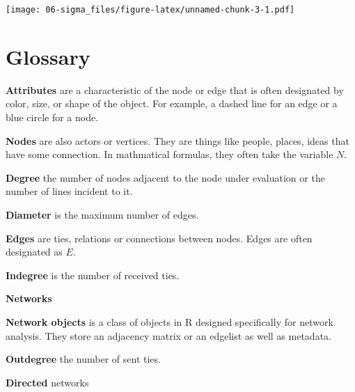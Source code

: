 \documentclass[]{book}
\newenvironment{Shaded}{\begin{snugshade}}{\end{snugshade}}
\newcommand{\DataTypeTok}[1]{\textcolor[rgb]{0.13,0.29,0.53}{#1}}
\newcommand{\DecValTok}[1]{\textcolor[rgb]{0.00,0.00,0.81}{#1}}
\newcommand{\KeywordTok}[1]{\textcolor[rgb]{0.13,0.29,0.53}{\textbf{#1}}}
\newcommand{\NormalTok}[1]{#1}
\newcommand{\OperatorTok}[1]{\textcolor[rgb]{0.81,0.36,0.00}{\textbf{#1}}}
\newcommand{\StringTok}[1]{\textcolor[rgb]{0.31,0.60,0.02}{#1}}
\begin{document}
\begin{Shaded}
\end{Shaded}

\texttt{[image: 06-sigma\_files/figure-latex/unnamed-chunk-3-1.pdf]}

\hypertarget{glossary}{%
\chapter{Glossary}\label{glossary}}

\textbf{Attributes} are a characteristic of the node or edge that is often designated by color, size, or shape of the object. For example, a dashed line for an edge or a blue circle for a node.

\textbf{Nodes} are also actors or vertices. They are things like people, places, ideas that have some connection. In mathmatical formulas, they often take the variable \(N\).

\textbf{Degree} the number of nodes adjacent to the node under evaluation or the number of lines incident to it.

\textbf{Diameter} is the maximum number of edges.

\textbf{Edges} are ties, relations or connections between nodes. Edges are often designated as \(E\).

\textbf{Indegree} is the number of received ties.

\textbf{Networks}

\textbf{Network objects} is a class of objects in R designed specifically for network analysis. They store an adjacency matrix or an edgelist as well as metadata.

\textbf{Outdegree} the number of sent ties.

\textbf{Directed} networks


\end{document}
